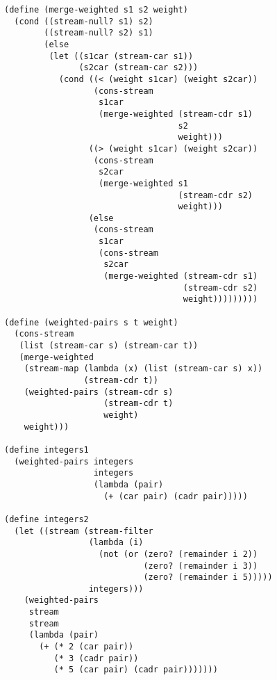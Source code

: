 \documentclass[a4paper,12pt]{article}
\begin{document}
\begin{lstlisting}
(define (merge-weighted s1 s2 weight)
  (cond ((stream-null? s1) s2)
        ((stream-null? s2) s1)
        (else
         (let ((s1car (stream-car s1))
               (s2car (stream-car s2)))
           (cond ((< (weight s1car) (weight s2car))
                  (cons-stream
                   s1car
                   (merge-weighted (stream-cdr s1)
                                   s2
                                   weight)))
                 ((> (weight s1car) (weight s2car))
                  (cons-stream
                   s2car
                   (merge-weighted s1
                                   (stream-cdr s2)
                                   weight)))
                 (else
                  (cons-stream
                   s1car
                   (cons-stream
                    s2car
                    (merge-weighted (stream-cdr s1)
                                    (stream-cdr s2)
                                    weight)))))))))

(define (weighted-pairs s t weight)
  (cons-stream
   (list (stream-car s) (stream-car t))
   (merge-weighted
    (stream-map (lambda (x) (list (stream-car s) x))
                (stream-cdr t))
    (weighted-pairs (stream-cdr s)
                    (stream-cdr t)
                    weight)
    weight)))

(define integers1
  (weighted-pairs integers
                  integers
                  (lambda (pair)
                    (+ (car pair) (cadr pair)))))

(define integers2
  (let ((stream (stream-filter
                 (lambda (i)
                   (not (or (zero? (remainder i 2))
                            (zero? (remainder i 3))
                            (zero? (remainder i 5)))))
                 integers)))
    (weighted-pairs
     stream
     stream
     (lambda (pair)
       (+ (* 2 (car pair))
          (* 3 (cadr pair))
          (* 5 (car pair) (cadr pair)))))))
\end{lstlisting}
\end{document}
